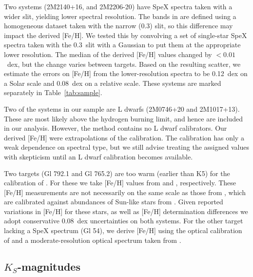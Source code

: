 \documentclass[twocolumn]{aastex62}
\begin{document}
Two systems (2M2140+16, and 2M2206-20) have SpeX spectra taken with a wider slit, yielding lower spectral resolution. The bands in \citet{Mann2014} are defined using a homogeneous dataset taken with the narrow (0.3\arcsec) slit, so this difference may impact the derived [Fe/H]. We tested this by convolving a set of single-star SpeX spectra taken with the 0.3\arcsec\ slit with a Gaussian to put them at the appropriate lower resolution. The median of the derived [Fe/H] values changed by $<0.01$~dex, but the change varies between targets. Based on the resulting scatter, we estimate the errors on [Fe/H] from the lower-resolution spectra to be 0.12~dex on a Solar scale and 0.08~dex on a relative scale. These systems are marked separately in Table~\ref{tab:sample}. 

Two of the systems in our sample are L dwarfs (2M0746+20 and 2M1017+13). These are most likely above the hydrogen burning limit, and hence are included in our analysis. However, the \citet{Mann2014} method contains no L dwarf calibrators. Our derived [Fe/H] were extrapolations of the \citet{Mann2014} calibration. The \citet{Mann2014} calibration has only a weak dependence on spectral type, but we still advise treating the assigned values with skepticism until an L dwarf calibration becomes available. 

Two targets (Gl 792.1 and Gl 765.2) are too warm (earlier than K5) for the calibration of \citet{Mann2013a}. For these we take [Fe/H] values from \citet{2011A&A...530A.138C} and \citet{2010A&ARv..18...67T}, respectively. These [Fe/H] measurements are not necessarily on the same scale as those from \citet{Mann2013a}, which are calibrated against abundances of Sun-like stars from \citet{2015ApJ...805..126B,2016ApJS..225...32B}. Given reported variations in [Fe/H] for these stars, as well as [Fe/H] determination differences \citep{2014AJ....148...54H,2016ApJS..226....4H} we adopt conservative 0.08~dex uncertainties on both systems. For the other target lacking a SpeX spectrum (Gl 54), we derive [Fe/H] using the optical calibration of \citet{Mann2013a} and a moderate-resolution optical spectrum taken from \citet{Gaidos2014}.

\subsection{$K_S$-magnitudes}\label{sec:mags}
\end{document}
